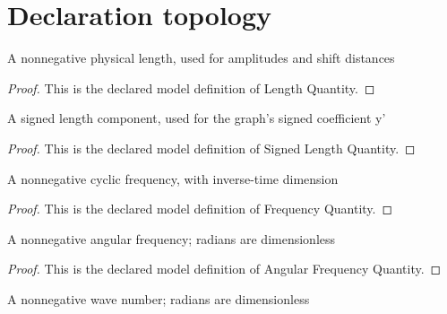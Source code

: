 \section{Declaration topology}
\begin{definition}
  \label{def:physics:phyx-mini-0303:phyxminiproblems-problemphyxmini0303-lengthquantity}
  A nonnegative physical length, used for amplitudes and shift distances
\end{definition}
\begin{proof}
  This is the declared model definition of Length Quantity.
\end{proof}
\begin{definition}
  \label{def:physics:phyx-mini-0303:phyxminiproblems-problemphyxmini0303-signedlengthquantity}
  A signed length component, used for the graph's signed coefficient y'
\end{definition}
\begin{proof}
  This is the declared model definition of Signed Length Quantity.
\end{proof}
\begin{definition}
  \label{def:physics:phyx-mini-0303:phyxminiproblems-problemphyxmini0303-frequencyquantity}
  A nonnegative cyclic frequency, with inverse-time dimension
\end{definition}
\begin{proof}
  This is the declared model definition of Frequency Quantity.
\end{proof}
\begin{definition}
  \label{def:physics:phyx-mini-0303:phyxminiproblems-problemphyxmini0303-angularfrequencyquantity}
  A nonnegative angular frequency; radians are dimensionless
\end{definition}
\begin{proof}
  This is the declared model definition of Angular Frequency Quantity.
\end{proof}
\begin{definition}
  \label{def:physics:phyx-mini-0303:phyxminiproblems-problemphyxmini0303-wavenumberquantity}
  A nonnegative wave number; radians are dimensionless
\end{definition}
